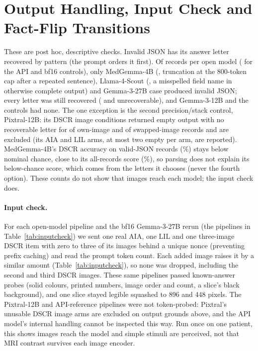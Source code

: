 \documentclass[11pt]{article}
\begin{document}
\section{Output Handling, Input Check and Fact-Flip Transitions}
\label{sec:app-handling}

These are post hoc, descriptive checks. Invalid JSON has its answer letter recovered by pattern (the prompt orders it first). Of \vfourParseNMedGemma{} records per open model (\vfourParseNGemini{} for the API and bf16 controls), only MedGemma-4B (\vfourParseInvalidMedGemma{}, truncation at the 800-token cap after a repeated sentence), Llama-4-Scout (\vfourParseInvalidScout{}, a misspelled field name in otherwise complete output) and \vfourParseInvalidGemmaTwentySeven{} Gemma-3-27B case produced invalid JSON; every letter was still recovered (\vfourParseNoLetterMedGemma{} and \vfourParseNoLetterScout{} unrecoverable), and Gemma-3-12B and the controls had none. The one exception is the second precision/stack control, Pixtral-12B: its DSCR image conditions returned empty output with no recoverable letter for \vfourPixtralDscrEmptyOwn{} of \vfourNDSCR{} own-image and \vfourPixtralDscrEmptySwap{} of \vfourPixtralDscrSwapN{} swapped-image records and are excluded (its AIA and LIL arms, at most two empty per arm, are reported). MedGemma-4B's DSCR accuracy on valid-JSON records (\vfourDscrAccValidMedGemma{}\%) stays below nominal chance, close to its all-records score (\vfourDscrAccAllMedGemma{}\%), so parsing does not explain its below-chance score, which comes from the letters it chooses (never the fourth option). These counts do not show that images reach each model; the input check does.

\paragraph{Input check.} For each open-model pipeline and the bf16 Gemma-3-27B rerun (the pipelines in Table~\ref{tab:inputcheck}) we sent one real AIA, one LIL and one three-image DSCR item with zero to three of its images behind a unique nonce (preventing prefix caching) and read the prompt token count. Each added image raises it by a similar amount (Table~\ref{tab:inputcheck}), so none was dropped, including the second and third DSCR images. These same pipelines passed known-answer probes (solid colours, printed numbers, image order and count, a slice's black background), and one slice stayed legible squashed to 896 and 448 pixels. The Pixtral-12B and API-reference pipelines were not token-probed: Pixtral's unusable DSCR image arms are excluded on output grounds above, and the API model's internal handling cannot be inspected this way. Run once on one patient, this shows images reach the model and simple stimuli are perceived, not that MRI contrast survives each image encoder.
\end{document}
